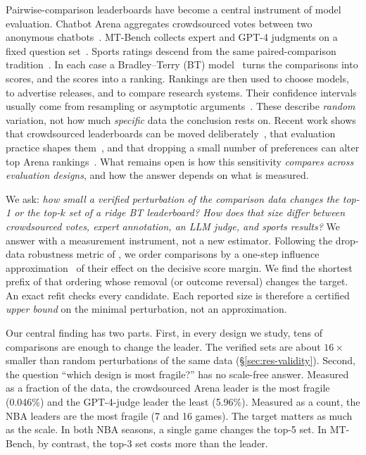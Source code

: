 \documentclass{article}
\begin{document}
Pairwise-comparison leaderboards have become a central instrument of model evaluation. Chatbot Arena aggregates crowdsourced votes between two anonymous chatbots~\citep{Chiang2024ChatbotAA}. MT-Bench collects expert and GPT-4 judgments on a fixed question set~\citep{Zheng2023JudgingLW}. Sports ratings descend from the same paired-comparison tradition~\citep{Elo1978TheRO}. In each case a Bradley--Terry (BT) model~\citep{Bradley1952RankAO} turns the comparisons into scores, and the scores into a ranking. Rankings are then used to choose models, to advertise releases, and to compare research systems. Their confidence intervals usually come from resampling or asymptotic arguments~\citep{Efron1979BootstrapMA,Gao2021UncertaintyQI}. These describe \emph{random} variation, not how much \emph{specific} data the conclusion rests on. Recent work shows that crowdsourced leaderboards can be moved deliberately~\citep{Min2025ImprovingYM}, that evaluation practice shapes them~\citep{Singh2025TheLI}, and that dropping a small number of preferences can alter top Arena rankings~\citep{Huang2025DroppingJA}. What remains open is how this sensitivity \emph{compares across evaluation designs}, and how the answer depends on what is measured.

We ask: \emph{how small a verified perturbation of the comparison data changes the top-1 or the top-$k$ set of a ridge BT leaderboard? How does that size differ between crowdsourced votes, expert annotation, an LLM judge, and sports results?} We answer with a measurement instrument, not a new estimator. Following the drop-data robustness metric of \citet{Broderick2020AnAF}, we order comparisons by a one-step influence approximation~\citep{Cook2000DetectionOI,Koh2017UnderstandingBP} of their effect on the decisive score margin. We find the shortest prefix of that ordering whose removal (or outcome reversal) changes the target. An exact refit checks every candidate. Each reported size is therefore a certified \emph{upper bound} on the minimal perturbation, not an approximation.

Our central finding has two parts. First, in every design we study, tens of comparisons are enough to change the leader. The verified sets are about $16\times$ smaller than random perturbations of the same data (\S\ref{sec:res-validity}). Second, the question ``which design is most fragile?'' has no scale-free answer. Measured as a fraction of the data, the crowdsourced Arena leader is the most fragile (0.046\%) and the GPT-4-judge leader the least (5.96\%). Measured as a count, the NBA leaders are the most fragile (7 and 16 games). The target matters as much as the scale. In both NBA seasons, a single game changes the top-5 set. In MT-Bench, by contrast, the top-3 set costs more than the leader.
\end{document}
